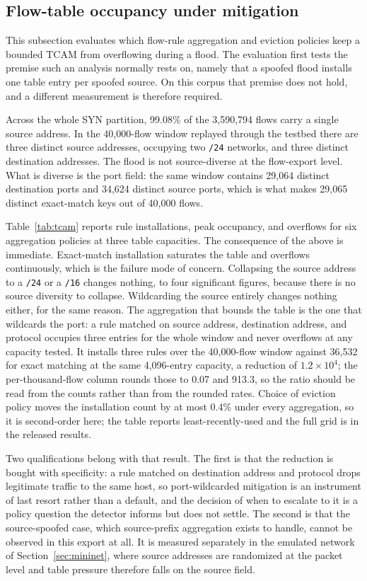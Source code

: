 \documentclass{ieeeaccess}
\begin{document}
\subsection{Flow-table occupancy under mitigation}
\label{sec:flowtable}
This subsection evaluates which flow-rule aggregation and eviction policies
keep a bounded TCAM from overflowing during a flood. The evaluation first
tests the premise such an analysis normally rests on, namely that a spoofed
flood installs one table entry per spoofed source. On this corpus that premise
does not hold, and a different measurement is therefore required.

Across the whole SYN partition, 99.08\% of the 3,590,794 flows carry a single
source address. In the 40,000-flow window replayed through the testbed there are
three distinct source addresses, occupying two \texttt{/24} networks, and three
distinct destination addresses. The flood is not source-diverse at the
flow-export level. What is diverse is the port field: the same window contains
29,064 distinct destination ports and 34,624 distinct source ports, which is
what makes 29,065 distinct exact-match keys out of 40,000 flows.

Table~\ref{tab:tcam} reports rule installations, peak occupancy, and overflows
for six aggregation policies at three table capacities. The consequence of the
above is immediate. Exact-match installation saturates the table and overflows
continuously, which is the failure mode of concern. Collapsing the
source address to a \texttt{/24} or a \texttt{/16} changes nothing, to four
significant figures, because there is no source diversity to collapse.
Wildcarding the source entirely changes nothing either, for the same reason. The
aggregation that bounds the table is the one that wildcards the port: a rule
matched on source address, destination address, and protocol occupies three
entries for the whole window and never overflows at any capacity tested. It
installs three rules over the 40,000-flow window against 36,532 for exact
matching at the same 4,096-entry capacity, a reduction of $1.2\times10^{4}$; the
per-thousand-flow column rounds those to 0.07 and 913.3, so the ratio should be
read from the counts rather than from the rounded rates. Choice of eviction
policy moves the installation count by at most 0.4\% under every aggregation, so
it is second-order here; the table reports least-recently-used and the full grid
is in the released results.

Two qualifications belong with that result. The first is that the reduction is
bought with specificity: a rule matched on destination address and protocol
drops legitimate traffic to the same host, so port-wildcarded mitigation is an
instrument of last resort rather than a default, and the decision of when to
escalate to it is a policy question the detector informs but does not settle.
The second is that the source-spoofed case, which source-prefix aggregation
exists to handle, cannot be observed in this export at all. It is measured
separately in the emulated network of Section~\ref{sec:mininet}, where source addresses are randomized at the packet level and table pressure
therefore falls on the source field.
\end{document}
